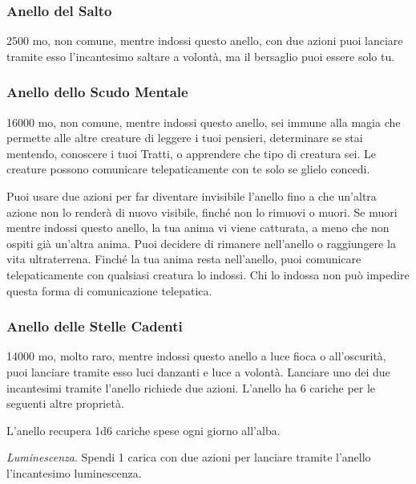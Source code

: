 \begin{multicols}{2}
\medskip

\subsubsection*{Anello del Salto}
2500 mo, non comune, mentre indossi questo anello, con due azioni puoi lanciare tramite esso l'incantesimo saltare a volontà, ma il bersaglio puoi essere solo tu.

\subsubsection*{Anello dello Scudo Mentale}
16000 mo, non comune, mentre indossi questo anello, sei immune alla magia che permette alle altre creature di leggere i tuoi pensieri, determinare se stai mentendo, conoscere i tuoi Tratti, o apprendere che tipo di creatura sei. Le creature possono comunicare telepaticamente con te solo se glielo concedi.

Puoi usare due azioni per far diventare invisibile l'anello fino a che un'altra azione non lo renderà di nuovo visibile, finché non lo rimuovi o muori. Se muori mentre indossi questo anello, la tua anima vi viene catturata, a meno che non ospiti già un'altra anima. Puoi decidere di rimanere nell'anello o raggiungere la vita ultraterrena. Finché la tua anima resta nell'anello, puoi comunicare telepaticamente con qualsiasi creatura lo indossi. Chi lo indossa non può impedire questa forma di comunicazione telepatica.

\subsubsection*{Anello delle Stelle Cadenti}
14000 mo, molto raro, mentre indossi questo anello a luce fioca o all'oscurità, puoi lanciare tramite esso luci danzanti e luce a volontà. Lanciare uno dei due incantesimi tramite l'anello richiede due azioni. L'anello ha 6 cariche per le seguenti altre proprietà.

L'anello recupera 1d6 cariche spese ogni giorno all'alba.

\textit{Luminescenza}. Spendi 1 carica con due azioni per lanciare tramite l'anello l'incantesimo luminescenza.


\end{multicols}
